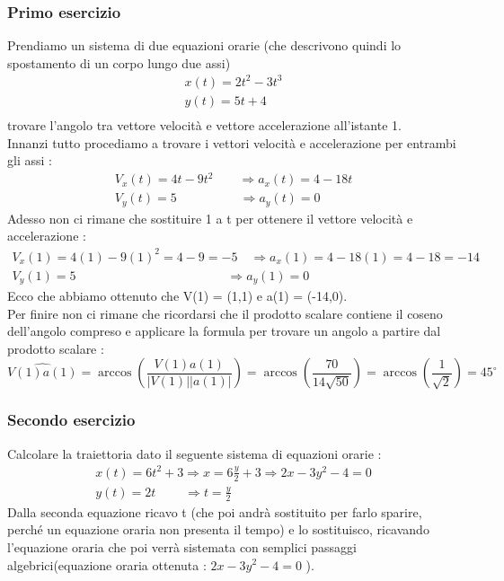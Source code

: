 \documentclass[fontsize = 20px, paper = a4]{article}
\begin{document}
\subsubsection{Primo esercizio}
Prendiamo un sistema di due equazioni orarie (che descrivono quindi lo spostamento di un corpo lungo due assi)
\[
\begin{array}{lr}
	x(t) = 2t^2 -3t^3 \\ 
	y(t) = 5t + 4 \\
\end{array}
\]
trovare l'angolo tra vettore velocità e vettore accelerazione all'istante 1. \\ 
Innanzi tutto procediamo a trovare i vettori velocità e accelerazione per entrambi gli assi :
\[
\begin{array}{lr}
	V_x(t) = 4t -9t^2  \qquad \Longrightarrow a_x(t) = 4 - 18t\\ 
	V_y(t) = 5  \qquad \quad \qquad \Longrightarrow a_y(t) = 0
\end{array}
\]
Adesso non ci rimane che sostituire 1 a t per ottenere il vettore velocità e accelerazione :
\[
\begin{array}{lr}
	V_x(1) = 4(1) -9(1)^2 = 4 - 9 = -5  \quad \Longrightarrow a_x(1) = 4 - 18(1) = 4- 18 = -14\\ 
	V_y(1) = 5  \qquad \qquad \quad \qquad \qquad \quad \qquad \Longrightarrow a_y(1) = 0
\end{array}
\]
Ecco che abbiamo ottenuto che V(1) = (1,1) e a(1) = (-14,0). \\  
Per finire non ci rimane che ricordarsi che il prodotto scalare contiene il coseno dell'angolo compreso e applicare la formula per trovare un angolo a partire dal prodotto scalare :
$$\widehat{V(1)a(1)} = \arccos \left(\frac{V(1) a(1)}{|V(1)||a(1)|} \right) =\arccos \left(\frac{70}{14\sqrt{50}} \right) = \arccos \left( \frac{1}{\sqrt{2}} \right) = 45 ^ \circ$$ 
\subsubsection{Secondo esercizio}
Calcolare la traiettoria dato il seguente sistema di equazioni orarie :
\[
\begin{array}{lr}
	x(t) = 6t^2 + 3  \Longrightarrow x = 6\frac{y}{2} + 3 \Longrightarrow 2x- 3y^2 - 4 = 0\\
	y(t) = 2t  \; \qquad \Longrightarrow t = \frac{y}{2}
\end{array}
\]
Dalla seconda equazione ricavo t (che poi andrà sostituito per farlo sparire, perché un equazione oraria non presenta il tempo) e lo sostituisco, ricavando l'equazione oraria che poi verrà sistemata con semplici passaggi algebrici(equazione oraria ottenuta : $ 2x- 3y^2 - 4 = 0$ ).
\end{document}
